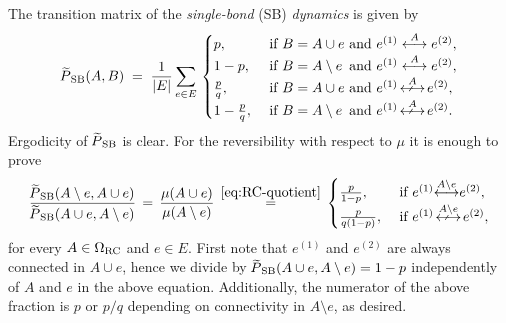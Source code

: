 \documentclass{dis}
\theoremstyle{citing}
\begin{document}
The transition matrix of the \emph{single-bond} (SB) \emph{dynamics} 
is given by
\begin{equation} \label{eq:SB}
{{\raisebox{2pt}{ ${\widetilde{{}}}$ }\mkern-14mu P}_{\rm SB}}(A,B) \;=\;  \frac1{{\left\vert {E} \right\vert}}\sum_{e\in E}\,\begin{cases}
p, & \text{ if } B=A\cup e \text{ and } 
				e^{(1)}\stackrel{A}{\longleftrightarrow}e^{(2)},\\
1-p, & \text{ if } B=A\setminus e \,\text{ and } 
				e^{(1)}\stackrel{A}{\longleftrightarrow}e^{(2)},\\
\frac{p}{q}, & \text{ if } B=A\cup e \text{ and } 
				e^{(1)}{\mathop{\hspace{1.3pt}\stackrel{{A}}{\longarrownot\longleftrightarrow}}\hspace{1.3pt}}e^{(2)},\\
1-\frac{p}{q}, & \text{ if } B=A\setminus e \,\text{ and } 
				e^{(1)}{\mathop{\hspace{1.3pt}\stackrel{{A}}{\longarrownot\longleftrightarrow}}\hspace{1.3pt}}e^{(2)}.
\end{cases}
\end{equation}
Ergodicity of ${{\raisebox{2pt}{ ${\widetilde{{}}}$ }\mkern-14mu P}_{\rm SB}}$ is clear. 
For the reversibility with respect to $\mu$ it is enough 
to prove
\[
\frac{{{\raisebox{2pt}{ ${\widetilde{{}}}$ }\mkern-14mu P}_{\rm SB}}(A\setminus e,A\cup e)}{{{\raisebox{2pt}{ ${\widetilde{{}}}$ }\mkern-14mu P}_{\rm SB}}(A\cup e, A\setminus e)} 
\,=\, \frac{\mu(A\cup e)}{\mu(A\setminus e)} 
\,\stackrel{\eqref{eq:RC-quotient}}{=}\, 
\begin{cases}
\frac{p}{1-p}, & \text{ if } e^{(1)}{\mathop{\stackrel{{A\setminus e}}{\longleftrightarrow}}}e^{(2)}, \\
\frac{p}{q(1-p)}, & \text{ if } e^{(1)}{\mathop{\hspace{1.3pt}\stackrel{{A\setminus e}}{\longarrownot\longleftrightarrow}}\hspace{1.3pt}}e^{(2)}, \\
\end{cases}
\]
for every $A\in{{\Omega}_{\rm RC}}$ and $e\in E$.
First note that $e^{(1)}$ and $e^{(2)}$ are always 
connected in $A\cup e$, hence we divide by 
${{\raisebox{2pt}{ ${\widetilde{{}}}$ }\mkern-14mu P}_{\rm SB}}(A\cup e, A\setminus e)=1-p$ independently of  
$A$ and $e$ in the above equation. 
Additionally, the numerator of the above fraction is $p$ or 
$p/q$ depending on connectivity in $A\setminus e$, as desired.
\end{document}
